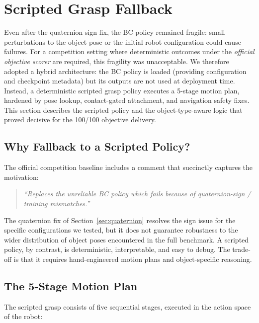 \section{Scripted Grasp Fallback}
\label{sec:scripted_grasp}

Even after the quaternion sign fix, the BC policy remained fragile: small perturbations to the object pose or the initial robot configuration could cause failures. For a competition setting where deterministic outcomes under the \emph{official objective scorer} are required, this fragility was unacceptable. We therefore adopted a hybrid architecture: the BC policy is loaded (providing configuration and checkpoint metadata) but its outputs are not used at deployment time. Instead, a deterministic scripted grasp policy executes a 5-stage motion plan, hardened by pose lookup, contact-gated attachment, and navigation safety fixes. This section describes the scripted policy and the object-type-aware logic that proved decisive for the 100/100 objective delivery.

\subsection{Why Fallback to a Scripted Policy?}
\label{sec:scripted_grasp:why}

The official competition baseline includes a comment that succinctly captures the motivation:
\begin{quote}
\emph{``Replaces the unreliable BC policy which fails because of quaternion-sign / training mismatches.''}
\end{quote}

The quaternion fix of Section~\ref{sec:quaternion} resolves the sign issue for the specific configurations we tested, but it does not guarantee robustness to the wider distribution of object poses encountered in the full benchmark. A scripted policy, by contrast, is deterministic, interpretable, and easy to debug. The trade-off is that it requires hand-engineered motion plans and object-specific reasoning.

\subsection{The 5-Stage Motion Plan}
\label{sec:scripted_grasp:five_stage}

The scripted grasp consists of five sequential stages, executed in the action space of the robot:

